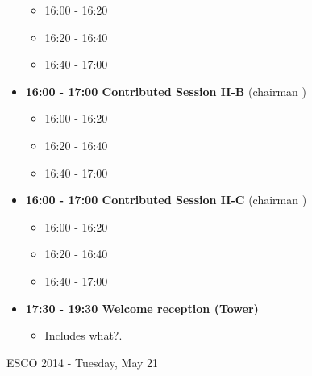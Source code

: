 \documentclass[10pt, A4]{article}
\begin{document}
\begin{itemize}
  \begin{itemize}
    \item 16:00 - 16:20 
    \item 16:20 - 16:40 
    \item 16:40 - 17:00 
  \end{itemize}
  \item {\bf 16:00 - 17:00 Contributed Session II-B} (chairman ) 
  \begin{itemize}
    \item 16:00 - 16:20 
    \item 16:20 - 16:40 
    \item 16:40 - 17:00 
  \end{itemize}
    \item {\bf 16:00 - 17:00 Contributed Session II-C} (chairman ) 
  \begin{itemize}
    \item 16:00 - 16:20 
    \item 16:20 - 16:40 
    \item 16:40 - 17:00 
  \end{itemize}    
  \item {\bf 17:30 - 19:30 Welcome reception (Tower)} 
  \begin{itemize}
     \item Includes what?.
  \end{itemize}
\end{itemize}

\newpage

\centerline{\huge ESCO 2014 - Tuesday, May 21}
\vspace{4mm}
\end{document}
